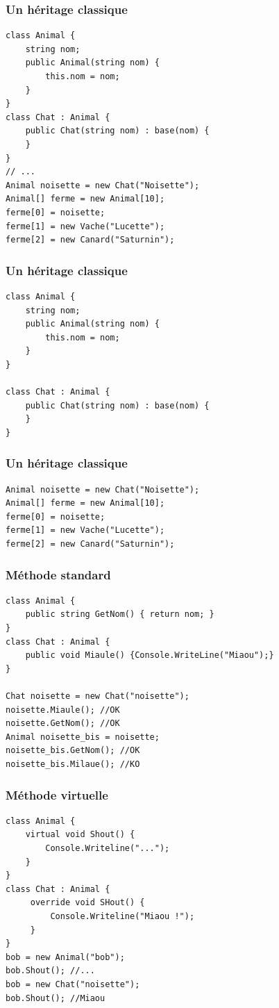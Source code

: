 \documentclass{beamer}
\begin{document}
\begin{frame}[fragile]
\frametitle{Un héritage classique}
\begin{lstlisting}
class Animal {
    string nom;
    public Animal(string nom) {
        this.nom = nom;
    }
}
class Chat : Animal {
	public Chat(string nom) : base(nom) {
    }
}
// ...
Animal noisette = new Chat("Noisette");
Animal[] ferme = new Animal[10];
ferme[0] = noisette;
ferme[1] = new Vache("Lucette");
ferme[2] = new Canard("Saturnin");
\end{lstlisting}
\end{frame}


\begin{frame}[fragile]
\frametitle{Un héritage classique}
\begin{lstlisting}
class Animal {
    string nom;
    public Animal(string nom) {
        this.nom = nom;
    }
}

class Chat : Animal {
    public Chat(string nom) : base(nom) {
    }
}
\end{lstlisting}
\end{frame}

\begin{frame}[fragile]
\frametitle{Un héritage classique}
\begin{lstlisting}
Animal noisette = new Chat("Noisette");
Animal[] ferme = new Animal[10];
ferme[0] = noisette;
ferme[1] = new Vache("Lucette");
ferme[2] = new Canard("Saturnin");
\end{lstlisting}
\end{frame}

\begin{frame}[fragile]
\frametitle{Méthode standard}
\begin{lstlisting}
class Animal {
    public string GetNom() { return nom; }
}
class Chat : Animal {
    public void Miaule() {Console.WriteLine("Miaou");}
}

Chat noisette = new Chat("noisette");
noisette.Miaule(); //OK
noisette.GetNom(); //OK
Animal noisette_bis = noisette;
noisette_bis.GetNom(); //OK
noisette_bis.Milaue(); //KO
\end{lstlisting}
\end{frame}


\begin{frame}[fragile]
\frametitle{Méthode virtuelle}
\begin{lstlisting}
class Animal {
    virtual void Shout() {
        Console.Writeline("...");
    }
}
class Chat : Animal {
     override void SHout() {
         Console.Writeline("Miaou !");
     }
}
bob = new Animal("bob");
bob.Shout(); //...
bob = new Chat("noisette");
bob.Shout(); //Miaou
\end{lstlisting}
\end{frame}
\end{document}
